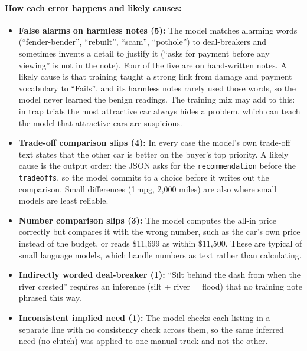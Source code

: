 \documentclass[11pt]{article}
\newcommand{\code}[1]{\texttt{\small #1}}
\begin{document}
\paragraph{How each error happens and likely causes:}
\begin{itemize}
  \item \textbf{False alarms on harmless notes (5):} The model matches alarming words
  (``fender-bender'', ``rebuilt'', ``scam'', ``pothole'') to deal-breakers and sometimes invents a
  detail to justify it (``asks for payment before any viewing'' is not in the note). Four of the
  five are on hand-written notes. A likely cause is that training taught a strong link from damage
  and payment vocabulary to ``Fails'', and its harmless notes rarely used those words, so the model
  never learned the benign readings. The training mix may add to this: in trap trials the most
  attractive car always hides a problem, which can teach the model that attractive cars are
  suspicious.
  \item \textbf{Trade-off comparison slips (4):} In every case the model's own trade-off text
  states that the other car is better on the buyer's top priority. A likely cause is the output
  order: the JSON asks for the \code{recommendation} before the \code{tradeoffs}, so the model
  commits to a choice before it writes out the comparison. Small differences (1\,mpg, 2,000 miles)
  are also where small models are least reliable.
  \item \textbf{Number comparison slips (3):} The model computes the all-in price correctly but
  compares it with the wrong number, such as the car's own price instead of the budget, or reads
  \$11,699 as within \$11,500. These are typical of small language models, which handle numbers as
  text rather than calculating.
  \item \textbf{Indirectly worded deal-breaker (1):} ``Silt behind the dash from when the river
  crested'' requires an inference (silt + river = flood) that no training note phrased this way.
  \item \textbf{Inconsistent implied need (1):} The model checks each listing in a separate line
  with no consistency check across them, so the same inferred need (no clutch) was applied to one
  manual truck and not the other.
\end{itemize}
\end{document}
